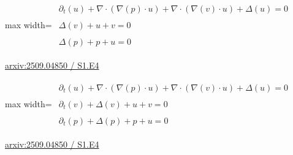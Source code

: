 \documentclass[UTF8,10pt,a4paper,fontset=mac]{ctexart}
\begin{document}
\begin{minipage}{\linewidth}\begin{center}\begin{adjustbox}{max width=\linewidth}$\displaystyle\begin{gathered}\begin{gathered}\partial_{t}(u)+\nabla\cdot(\nabla(p)\cdot u)+\nabla\cdot(\nabla(v)\cdot u)+\Delta(u)=0\end{gathered}\\[5pt]\begin{gathered}\Delta(v)+u+v=0\end{gathered}\\[5pt]\begin{gathered}\Delta(p)+p+u=0\end{gathered}\end{gathered}$\end{adjustbox}\end{center}{\small\href{https://arxiv.org/html/2509.04850#S1.E4}{arxiv:2509.04850 / S1.E4}}\par\end{minipage}\par\vspace{6mm}

\begin{minipage}{\linewidth}\begin{center}\begin{adjustbox}{max width=\linewidth}$\displaystyle\begin{gathered}\begin{gathered}\partial_{t}(u)+\nabla\cdot(\nabla(p)\cdot u)+\nabla\cdot(\nabla(v)\cdot u)+\Delta(u)=0\end{gathered}\\[5pt]\begin{gathered}\partial_{t}(v)+\Delta(v)+u+v=0\end{gathered}\\[5pt]\begin{gathered}\partial_{t}(p)+\Delta(p)+p+u=0\end{gathered}\end{gathered}$\end{adjustbox}\end{center}{\small\href{https://arxiv.org/html/2509.04850#S1.E4}{arxiv:2509.04850 / S1.E4}}\par\end{minipage}\par\vspace{6mm}
\end{document}
